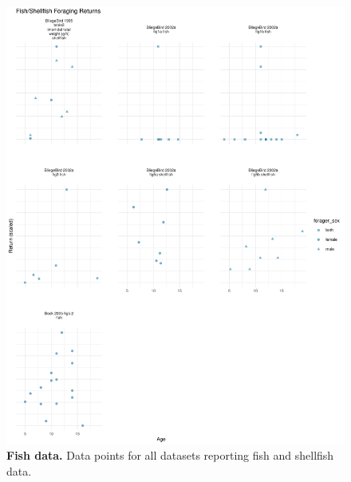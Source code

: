\begin{figure}[h]
\centering
\includegraphics[width=12cm] {text/images/Figure_S8.pdf}
\renewcommand{\thefigure}{S\arabic{figure}}
\caption{\textbf{Fish data.} Data points for all datasets reporting fish and shellfish data.}
\label{fig:fish}
\end{figure}

